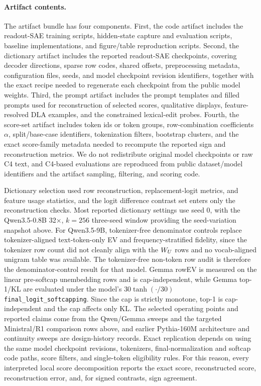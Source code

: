 \paragraph{Artifact contents.}
The artifact bundle has four components.
First, the code artifact includes the readout-SAE training scripts,
hidden-state capture and evaluation scripts, baseline implementations, and
figure/table reproduction scripts. Second, the dictionary artifact includes
the reported readout-SAE checkpoints,
covering decoder directions, sparse row codes, shared offsets, preprocessing metadata,
configuration files, seeds, and model checkpoint revision identifiers, together
with the exact recipe needed to regenerate each checkpoint from the public
model weights. Third, the prompt
artifact includes the prompt templates and filled prompts used for
reconstruction of selected scores, qualitative displays, feature-resolved DLA examples, and
the constrained lexical-edit probes. Fourth, the score-set artifact includes
token ids or token groups, row-combination coefficients \(\alpha\),
split/base-case identifiers, tokenization filters, bootstrap clusters, and the
exact score-family metadata needed to recompute the reported sign and
reconstruction metrics. We do not redistribute original model checkpoints or
raw C4 text, and C4-based evaluations are reproduced from public dataset/model
identifiers and the artifact sampling, filtering, and scoring code.

Dictionary selection used row reconstruction, replacement-logit metrics, and
feature usage statistics, and the logit difference contrast set enters only
the reconstruction checks. Most reported dictionary settings use seed \(0\), with the
Qwen3.5-0.8B 32$\times$, $k=256$ three-seed window providing the
seed-variation snapshot above.
For Qwen3.5-9B, tokenizer-free denominator controls replace tokenizer-aligned
text-token-only EV and frequency-stratified fidelity, since the tokenizer row
count did not cleanly align with the $W_U$ rows and no vocab-aligned unigram
table was available. The tokenizer-free non-token row audit is therefore
the denominator-control result for that model. Gemma rowEV is measured on the
linear pre-softcap unembedding rows and is cap-independent, while Gemma top-1/KL are
evaluated under the model's $30\tanh(\cdot/30)$
\texttt{final\_logit\_softcapping}. Since the cap is strictly monotone, top-1 is
cap-independent and the cap affects only KL.
The selected operating points and reported claims come from the Qwen/Gemma
sweeps and the targeted Ministral/R1 comparison rows above, and earlier Pythia-160M
architecture and continuity sweeps \citep{biderman2023pythia} are
design-history records.
Exact replication depends on using the same model checkpoint revisions,
tokenizers, final-normalization and softcap code paths, score filters, and
single-token eligibility rules. For this reason, every interpreted local score
decomposition reports the exact score, reconstructed score, reconstruction error, and,
for signed contrasts, sign agreement.

